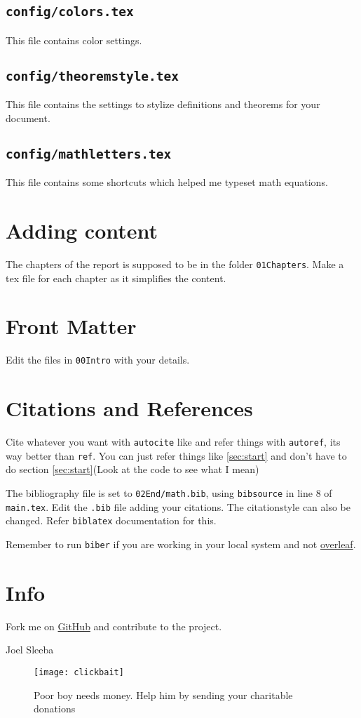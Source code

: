   \subsection{\texttt{config/colors.tex}}
  This file contains color settings.

  \subsection{\texttt{config/theoremstyle.tex}}
  This file contains the settings to stylize definitions and theorems for your document.

  \subsection{\texttt{config/mathletters.tex}}
  This file contains some shortcuts which helped me typeset math equations.

  \section{Adding content}
  The chapters of the report is supposed to be in the folder \texttt{01Chapters}. Make a tex file for each chapter as it simplifies the content.

  \section{Front Matter}
  Edit the files in \texttt{00Intro} with your details.

  \section{Citations and References}
  Cite whatever you want with \texttt{\/autocite} like \autocite[Theorem~3.14 \pno~69]{papaRudin} and refer things with \texttt{\/autoref}, its way better than \texttt{\/ref}. You can just refer things like \autoref{sec:start} and don't have to do section \ref{sec:start}(Look at the code to see what I mean)

  The bibliography file is set to \texttt{02End/math.bib}, using \texttt{bibsource} in line 8 of \texttt{main.tex}. Edit the \texttt{.bib} file adding your citations. The citationstyle can also be changed. Refer \texttt{biblatex} documentation for this. 

  Remember to run \texttt{biber} if you are working in your local system and not \href{https://www.overleaf.com}{overleaf}.

  \section{Info}
  Fork me on \href{https://github.com/joelsleeba/iisertvm-thesis-template}{GitHub} and contribute to the project.

  \vfill
  \centering
   Joel Sleeba

\newpage
\newpage
\begin{figure}
    \centering
    \texttt{[image: clickbait]}
    \caption{Poor boy needs money. Help him by sending your charitable donations}
    \label{fig:clickbait}
\end{figure}
